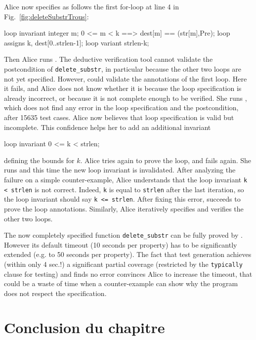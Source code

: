 Alice now specifies as follows the first for-loop at line 4 in
Fig.~\ref{fig:deleteSubstrTrous}:
\begin{pretty-codeACSL}
loop invariant \forall integer m; 0 <= m < k ==> dest[m] == \at(str[m],Pre);
loop assigns k, dest[0..strlen-1];
loop variant strlen-k;
\end{pretty-codeACSL}
Then Alice runs \Wp.
The deductive verification tool cannot 
validate the postcondition of \lstinline{delete_substr}, in particular
because the other two loops are not yet specified. 
However, \Wp could validate the
annotations of the first loop. Here it fails,
and Alice does not know whether it is because the loop
specification is already incorrect, or because it is not complete enough to be
verified.
She runs \stady, which does not find any error in the loop specification
and the postcondition, after 15635 test cases. Alice now believes that  loop
specification is valid but incomplete. This confidence helps her 
to add an additional invariant 
\begin{pretty-codeACSL} 
loop invariant 0 <= k < strlen;
\end{pretty-codeACSL} 
defining the bounds for $k$. Alice tries again to prove the loop, and \Wp fails
again. She runs \stady and this time the new loop invariant is invalidated.
After analyzing the failure on a simple counter-example,
Alice understands that the loop invariant \lstinline{k < strlen}
is not correct. Indeed, \lstinline{k} is equal to \lstinline{strlen} after 
the last iteration, so the loop invariant should say \lstinline{k <= strlen}.
After fixing this error, \Wp succeeds to prove the loop annotations.
Similarly, Alice iteratively specifies and verifies the other two loops.


The now completely specified function \lstinline{delete_substr}
can be fully proved by \Wp. 
However its default timeout (10 seconds per property) 
has to be significantly extended (e.g. to 50 seconds per property).
The fact that test generation achieves (within only 4 sec.!) a significant partial coverage 
(restricted by the \lstinline'typically' clause for testing) and finds
no error convinces Alice to increase the timeout,
that could be a waste of time when a counter-example can show why the program
does not respect the specification.


\section*{Conclusion du chapitre}



